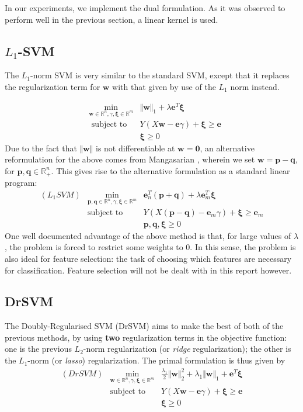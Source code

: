 \documentclass[11pt]{article}
\newcommand{\ds}{\displaystyle}
\begin{document}
In our experiments, we implement the dual formulation. As it was observed to perform well in the previous section, a linear kernel is used. 

\subsection{$L_1$-SVM \cite{l1norm}}

The $L_1$-norm SVM is very similar to the standard SVM, except that it replaces the regularization term for $\bm{w}$ with that given by use of the $L_1$ norm instead. 

\begin{eqnarray*}
& \ds \min_{\pmb{w}\in\mathbb{R}^n,\gamma,\pmb{\xi}\in\mathbb{R}^m} & \Vert \bm{w} \Vert_1  + \lambda\bm{e}^T\bm{\xi} 
\\
& \mbox{ subject to } & Y(X\bm{w} - \bm{e}\gamma) + \bm{\xi} \geq \bm{e} 
\\
& & \bm{\xi} \geq 0
\end{eqnarray*}
Due to the fact that $\Vert \bm{w} \Vert$ is not differentiable at $\bm{w} = \bm{0}$, an alternative reformulation for the above comes from Mangasarian \cite{pq}, wherein we set $\bm{w} = \bm{p} - \bm{q}$, for $\bm{p}, \bm{q} \in \mathbb{R}^n_+$. This gives rise to the alternative formulation as a standard linear program:
\begin{eqnarray*}
(L_1SVM) & \ds\min_{\bm{p},\bm{q}\in\mathbb{R}^n, \gamma, \bm{\xi}\in\mathbb{R}^m} & \bm{e}^T_n(\bm{p} + \bm{q}) + \lambda\bm{e}^T_m\bm{\xi}
\\
& \mbox{subject to } & Y(X(\bm{p} - \bm{q}) - \bm{e}_m\gamma) + \bm{\xi} \geq \bm{e}_m 
\\
& & \bm{p}, \bm{q}, \bm{\xi} \geq 0
\end{eqnarray*}
One well documented advantage of the above method is that, for large values of $\lambda$, the problem is forced to restrict some weights to 0. In this sense, the problem is also ideal for feature selection: the task of choosing which features are necessary for classification. Feature selection will not be dealt with in this report however. 

\subsection{DrSVM \cite{drsvm}}

The Doubly-Regularised SVM (DrSVM) aims to make the best of both of the previous methods, by using \textbf{two} regularization terms in the objective function: one is the previous $L_2$-norm regularization (or \emph{ridge} regularization); the other is the $L_1$-norm (or \emph{lasso}) regularization. The primal formulation is thus given by
\begin{eqnarray*}
(DrSVM) & \ds\min_{\pmb{w}\in\mathbb{R}^n, \gamma, \pmb{\xi}\in\mathbb{R}^m} & \ds\frac{\lambda_1}{2}\Vert \bm{w} \Vert_2^2 + \lambda_1 \Vert \bm{w} \Vert_1 + \bm{e}^T\bm{\xi}
\\
& \mbox{subject to } & Y(X\bm{w} - \bm{e}\gamma) + \bm{\xi} \geq \bm{e} 
\\
& & \bm{\xi} \geq 0
\end{eqnarray*}
\end{document}
